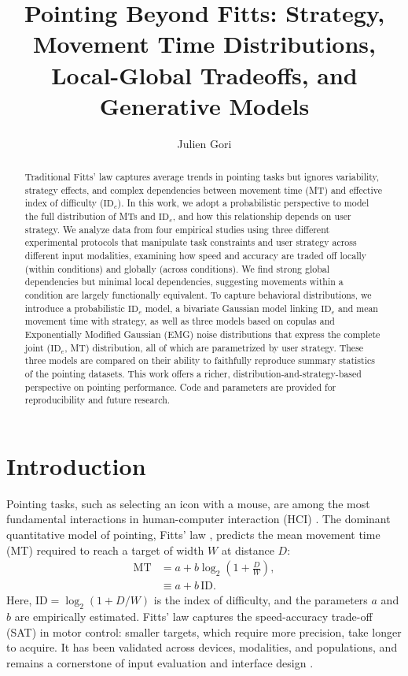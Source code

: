 \documentclass[acmlarge, manuscript,review]{acmart}
\title{Pointing Beyond Fitts: Strategy, Movement Time Distributions, Local-Global Tradeoffs, and Generative Models}
\author{Julien Gori}
\affiliation{%
  \institution{Sorbonne Université, CNRS, Inserm, Institut des Systèmes Intelligents et de Robotique, ISIR}
  \city{F-75005 Paris}
  \country{France}
}
\newcommand{\mt}{\ensuremath{{\text{MT}}}\xspace}
\newcommand{\ide}{\ensuremath{{\text{ID}_e}}\xspace}
\begin{document}
\begin{abstract}
Traditional Fitts' law captures average trends in pointing tasks but ignores variability, strategy effects, and complex dependencies between movement time (MT) and effective index of difficulty (\ide). 
In this work, we adopt a probabilistic perspective to model the full distribution of MTs and \ide, and how this relationship depends on user strategy.
We analyze data from four empirical studies using three different experimental protocols that manipulate task constraints and user strategy across different input modalities, examining how speed and accuracy are traded off locally (within conditions) and globally (across conditions). We find strong global dependencies but minimal local dependencies, suggesting movements within a condition are largely functionally equivalent.
To capture behavioral distributions, we introduce a probabilistic \ide model, a bivariate Gaussian model linking \ide and mean movement time with strategy, as well as three models based on copulas and Exponentially Modified Gaussian (EMG) noise distributions that express the complete joint (\ide, MT) distribution, all of which are parametrized by user strategy. These three models are compared on their ability to faithfully reproduce summary statistics of the pointing datasets. This work offers a richer, distribution-and-strategy-based perspective on pointing performance. Code and parameters are provided for reproducibility and future research.
\end{abstract}
\maketitle



\section{Introduction\label{sec:introduction}}
Pointing tasks, such as selecting an icon with a mouse, are among the most fundamental interactions in human-computer interaction (HCI) \cite{card1978,soukoreff2004}. 
The dominant quantitative model of pointing, Fitts' law \cite{fitts1954,soukoreff2004,gori2018tochi}, predicts the mean movement time (MT) required to reach a target of width \(W\) at distance \(D\):
\begin{align}
	\mt & = a + b \log_2 (1 + \tfrac{D}{W}), \label{eq:fitts} \\
	          & \equiv a + b\,\text{ID}.
\end{align}
Here, $\text{ID}=\log_2 (1+D/W)$ is the index of difficulty, and the parameters $a$ and $b$ are empirically estimated. 
Fitts' law captures the speed-accuracy trade-off (SAT) in motor control: smaller targets, which require more precision, take longer to acquire. 
It has been validated across devices, modalities, and populations, and remains a cornerstone of input evaluation and interface design \cite{card1978,soukoreff2004}.
\end{document}
